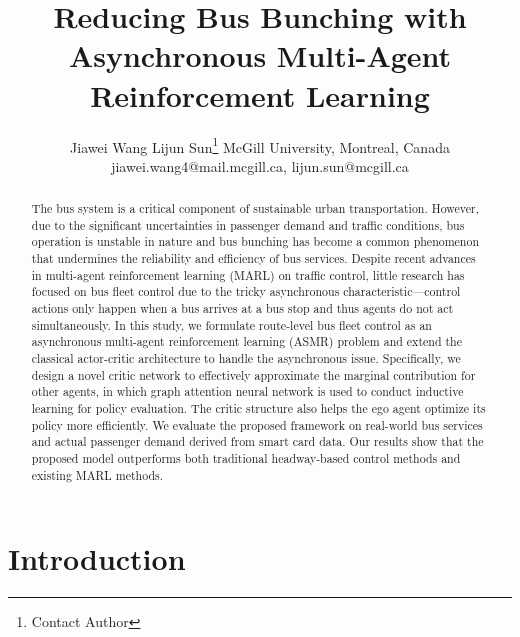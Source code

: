 \documentclass{article}
\title{Reducing Bus Bunching with Asynchronous Multi-Agent Reinforcement Learning}
\author{
Jiawei Wang
\And
Lijun Sun\footnote{Contact Author}
\affiliations
McGill University, Montreal, Canada
\emails
jiawei.wang4@mail.mcgill.ca,
lijun.sun@mcgill.ca
}
\begin{document}
\maketitle

\begin{abstract}
The bus system is a critical component of sustainable urban transportation. However, due to the significant uncertainties in passenger demand and traffic conditions, bus operation is unstable in nature and bus bunching has become a common phenomenon that undermines the reliability and efficiency of bus services. Despite recent advances in multi-agent reinforcement learning (MARL) on traffic control, little research has focused on bus fleet control due to the tricky asynchronous characteristic---control actions only happen when a bus arrives at a bus stop and thus agents do not act simultaneously. In this study, we formulate route-level bus fleet control as an asynchronous multi-agent reinforcement learning (ASMR) problem and extend the classical actor-critic architecture to handle the asynchronous issue. Specifically, we design a novel critic network to effectively approximate the marginal contribution for other agents, in which graph attention neural network is used to conduct inductive learning for policy evaluation. The critic structure also helps the ego agent optimize its policy more efficiently. We evaluate the proposed framework on real-world bus services and actual passenger demand derived from smart card data. Our results show that the proposed model outperforms both traditional headway-based control methods and existing MARL methods.
\end{abstract}


\section{Introduction}
\end{document}
